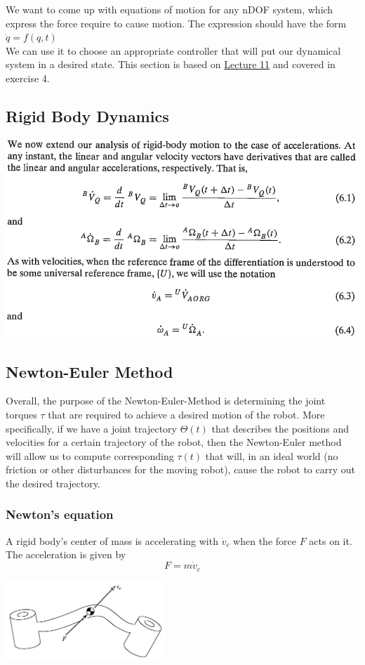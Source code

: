 We want to come up with equations of motion for any nDOF system, which express the force require to cause motion. The expression should have the form $ \dot{q} = f (q,t)$\\
We can use it to choose an appropriate controller that will put our dynamical system in a desired state.
This section is based on \href{https://www.youtube.com/watch?v=o3Xx3vi6qzo&list=PL65CC0384A1798ADF&index=12}{Lecture 11} and covered in exercise 4.

\subsection{Rigid Body Dynamics}
\begin{center}
	\includegraphics[width=14cm]{sections/imgs/29.png}
\end{center}

\subsection{Newton-Euler Method}
Overall, the purpose of the Newton-Euler-Method is determining the joint torques $\tau$ that are required to achieve a desired motion of the robot. More specifically, if we have a joint trajectory $\Theta (t)$ that describes the positions and velocities for a certain trajectory of the robot, then the Newton-Euler method will allow us to compute corresponding $\tau (t)$ that will, in an ideal world (no friction or other disturbances for the moving robot), cause the robot to carry out the desired trajectory.

\subsubsection{Newton's equation}
A rigid body's center of mass is accelerating with $ \dot{v}_{c} $ when the force $ F $ acts on it. The acceleration is given by
\[ F = m \dot{v}_{c} \]
\begin{center}
	\includegraphics[width=6cm]{sections/imgs/36.png}
\end{center}

